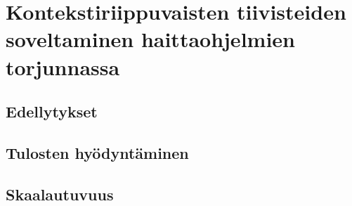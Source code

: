 \chapter{Kontekstiriippuvaisten tiivisteiden soveltaminen haittaohjelmien torjunnassa}

\section{Edellytykset}

\section{Tulosten hyödyntäminen}

\section{Skaalautuvuus}

